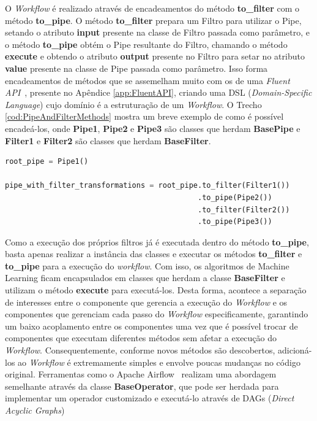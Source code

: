 \documentclass[portugues]{ic-tese}
\begin{document}
O \textit{Workflow} é realizado através de encadeamentos do método \textbf{to\_filter} com o método \textbf{to\_pipe}. O método \textbf{to\_filter} prepara um Filtro para utilizar o Pipe, setando o atributo \textbf{input} presente na classe de Filtro passada como parâmetro, e o método \textbf{to\_pipe} obtém o Pipe resultante do Filtro, chamando o método \textbf{execute} e obtendo o atributo \textbf{output} presente no Filtro para setar no atributo \textbf{value} presente na classe de Pipe passada como parâmetro. Isso forma encadeamentos de métodos que se assemelham muito com os de uma \textit{Fluent API}~\citep{Fowler_2005}, presente no Apêndice \ref{app:FluentAPI}, criando uma DSL (\textit{Domain-Specific Language}) cujo domínio é a estruturação de um \textit{Workflow}. O Trecho \ref{cod:PipeAndFilterMethods} mostra um breve exemplo de como é possível encadeá-los, onde \textbf{Pipe1}, \textbf{Pipe2} e \textbf{Pipe3} são classes que herdam \textbf{BasePipe} e \textbf{Filter1} e \textbf{Filter2} são classes que herdam \textbf{BaseFilter}.

\begin{lstlisting}[language=Python, caption=Exemplo de uso do \textit{Framework} para encadeamento dos Workflows,label=cod:PipeAndFilterMethods]
root_pipe = Pipe1()

pipe_with_filter_transformations = root_pipe.to_filter(Filter1())
											.to_pipe(Pipe2())
											.to_filter(Filter2())
											.to_pipe(Pipe3())
\end{lstlisting}

Como a execução dos próprios filtros já é executada dentro do método \textbf{to\_pipe}, basta apenas realizar a instância das classes e executar os métodos \textbf{to\_filter} e \textbf{to\_pipe} para a execução do \textit{workflow}. Com isso, os algoritmos de Machine Learning ficam encapsulados em classes que herdam a classe \textbf{BaseFilter} e utilizam o método \textbf{execute} para executá-los. Desta forma, acontece a separação de interesses entre o componente que gerencia a execução do \textit{Workflow} e os componentes que gerenciam cada passo do \textit{Workflow} especificamente, garantindo um baixo acoplamento entre os componentes uma vez que é possível trocar de componentes que executam diferentes métodos sem afetar a execução do \textit{Workflow}. Consequentemente, conforme novos métodos são descobertos, adicioná-los ao \textit{Workflow} é extremamente simples e envolve poucas mudanças no código original. Ferramentas como o Apache Airflow~\citep{ApacheAirflow_2022} realizam uma abordagem semelhante através da classe \textbf{BaseOperator}, que pode ser herdada para implementar um operador customizado e executá-lo através de DAGs (\textit{Direct Acyclic Graphs})
\end{document}
